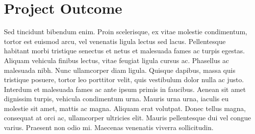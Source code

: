 \section*{Project Outcome}
Sed tincidunt bibendum enim. Proin scelerisque, ex vitae molestie condimentum, tortor est euismod arcu, vel venenatis ligula lectus sed lacus. Pellentesque habitant morbi tristique senectus et netus et malesuada fames ac turpis egestas. Aliquam vehicula finibus lectus, vitae feugiat ligula cursus ac. Phasellus ac malesuada nibh. Nunc ullamcorper diam ligula. Quisque dapibus, massa quis tristique posuere, tortor leo porttitor velit, quis vestibulum dolor nulla ac justo. Interdum et malesuada fames ac ante ipsum primis in faucibus. Aenean sit amet dignissim turpis, vehicula condimentum urna. Mauris urna urna, iaculis eu molestie sit amet, mattis ac magna. Aliquam erat volutpat. Donec tellus magna, consequat at orci ac, ullamcorper ultricies elit. Mauris pellentesque dui vel congue varius. Praesent non odio mi. Maecenas venenatis viverra sollicitudin. 